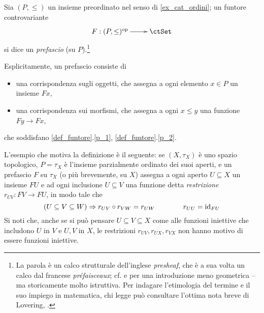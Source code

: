 \begin{definition}\label{exa_funtori_da_poset}
	Sia \((P,\le)\) un insieme preordinato nel senso di \ref{ex_cat_ordini}; un funtore controvariante
	\[\xymatrix{F : (P,\le)^\op \ar[r] & \ctSet}\]
	si dice un \emph{prefascio} (su \(P\)).\footnote{La parola è un calco strutturale dell'inglese \emph{presheaf}, che è a sua volta un calco dal francese \emph{préfaisceaux}; cf. \cite{Tennison1975,Bredon1997,Godement} e \cite[Cap. VII]{pedicchiofoundations} per una introduzione meno geometrica --ma storicamente molto istruttiva. Per indagare l'etimologia del termine e il suo impiego in matematica, chi legge può consultare l'ottima nota breve di Lovering, \cite{Lovering}.}

	Esplicitamente, un prefascio consiste di
	\begin{itemize}
		\item una corrispondenza sugli oggetti, che assegna a ogni elemento \(x\in P\) un insieme \(Fx\),
		\item una corrispondenza sui morfismi, che assegna a ogni \(x\le y\) una funzione \(Fy\to Fx\),
	\end{itemize}
	che soddisfano \ref{def_funtore}.\ref{p_1}, \ref{def_funtore}.\ref{p_2}.
\end{definition}
L'esempio che motiva la definizione è il seguente: se \((X,\tau_X)\) è uno spazio topologico, \(P=\tau_X\) è l'insieme parzialmente ordinato dei suoi aperti, e un prefascio \(F\) su \(\tau_X\) (o più brevemente, su \(X\)) assegna a ogni aperto \(U\subseteq X\) un insieme \(FU\) e ad ogni inclusione \(U\subseteq V\) una funzione detta \emph{restrizione} \(r_{UV} : FV \to FU\), in modo tale che
\[(U\subseteq V\subseteq W) \Rightarrow r_{UV}\circ r_{VW} = r_{UW} \qquad\qquad r_{UU} = \mathrm{id}_{FU}\]
Si noti che, anche se si può pensare \(U\subseteq V\subseteq X\) come alle funzioni iniettive che includono \(U\) in \(V\) e \(U,V\) in \(X\), le restrizioni \(r_{UV}, r_{UX}, r_{VX}\) non hanno motivo di essere funzioni iniettive.

